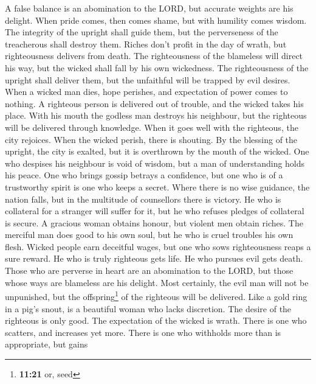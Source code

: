  A false balance is an abomination to the LORD, but
accurate weights are his delight.  When pride comes, then
comes shame, but with humility comes wisdom.  The
integrity of the upright shall guide them, but the perverseness of the
treacherous shall destroy them.  Riches don't profit in
the day of wrath, but righteousness delivers from death. 
The righteousness of the blameless will direct his way, but the wicked
shall fall by his own wickedness.  The righteousness of
the upright shall deliver them, but the unfaithful will be trapped by
evil desires.  When a wicked man dies, hope perishes, and
expectation of power comes to nothing.  A righteous person
is delivered out of trouble, and the wicked takes his place.
 With his mouth the godless man destroys his neighbour,
but the righteous will be delivered through knowledge. 
When it goes well with the righteous, the city rejoices. When the wicked
perish, there is shouting.  By the blessing of the
upright, the city is exalted, but it is overthrown by the mouth of the
wicked.  One who despises his neighbour is void of
wisdom, but a man of understanding holds his peace.  One
who brings gossip betrays a confidence, but one who is of a trustworthy
spirit is one who keeps a secret.  Where there is no wise
guidance, the nation falls, but in the multitude of counsellors there is
victory.  He who is collateral for a stranger will suffer
for it, but he who refuses pledges of collateral is secure.
 A gracious woman obtains honour, but violent men obtain
riches.  The merciful man does good to his own soul, but
he who is cruel troubles his own flesh.  Wicked people
earn deceitful wages, but one who sows righteousness reaps a sure
reward.  He who is truly righteous gets life. He who
pursues evil gets death.  Those who are perverse in heart
are an abomination to the LORD, but those whose ways are blameless are
his delight.  Most certainly, the evil man will not be
unpunished, but the offspring\footnote{\textbf{11:21} or, seed} of the
righteous will be delivered.  Like a gold ring in a pig's
snout, is a beautiful woman who lacks discretion.  The
desire of the righteous is only good. The expectation of the wicked is
wrath.  There is one who scatters, and increases yet
more. There is one who withholds more than is appropriate, but gains
